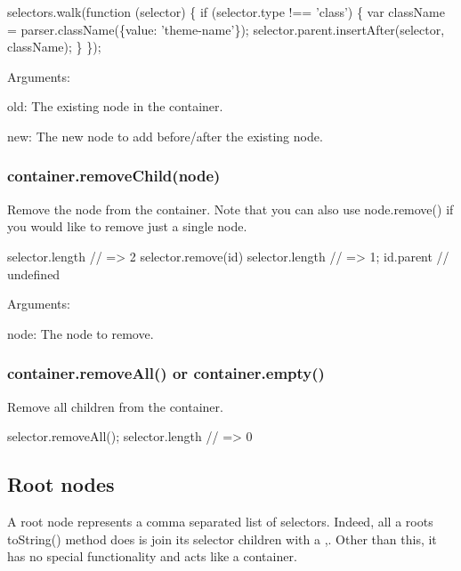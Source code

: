 \begin{DoxyCode}
selectors.walk(function (selector) \{
    if (selector.type !== 'class') \{
        var className = parser.className(\{value: 'theme-name'\});
        selector.parent.insertAfter(selector, className);
    \}
\});
\end{DoxyCode}


Arguments\+:


\begin{DoxyItemize}
\item {\ttfamily old}\+: The existing node in the container.
\item {\ttfamily new}\+: The new node to add before/after the existing node.
\end{DoxyItemize}

\subsubsection*{{\ttfamily container.\+remove\+Child(node)}}

Remove the node from the container. Note that you can also use {\ttfamily node.\+remove()} if you would like to remove just a single node.


\begin{DoxyCode}
selector.length // => 2
selector.remove(id)
selector.length // => 1;
id.parent       // undefined
\end{DoxyCode}


Arguments\+:


\begin{DoxyItemize}
\item {\ttfamily node}\+: The node to remove.
\end{DoxyItemize}

\subsubsection*{{\ttfamily container.\+remove\+All()} or {\ttfamily container.\+empty()}}

Remove all children from the container.


\begin{DoxyCode}
selector.removeAll();
selector.length // => 0
\end{DoxyCode}


\subsection*{Root nodes}

A root node represents a comma separated list of selectors. Indeed, all a root\textquotesingle{}s {\ttfamily to\+String()} method does is join its selector children with a \textquotesingle{},\textquotesingle{}. Other than this, it has no special functionality and acts like a container.

